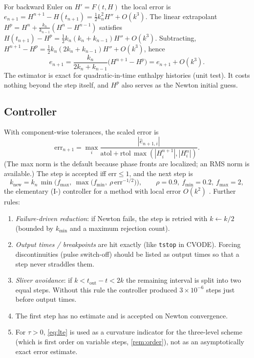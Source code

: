 \documentclass[11pt]{article}
\numberwithin{equation}{section}
\theoremstyle{remark}
\begin{document}
For backward Euler on $H'=F(t,H)$ the local error is
$e_{n+1}=H^{n+1}-H(t_{n+1})=\tfrac12k_n^2H''+O(k^3)$.  The linear extrapolant
$H^{p}=H^n+\frac{k_n}{k_{n-1}}(H^n-H^{n-1})$ satisfies
$H(t_{n+1})-H^{p}=\frac12k_n(k_n+k_{n-1})H''+O(k^3)$.  Subtracting,
$H^{n+1}-H^{p}=\frac12k_n(2k_n+k_{n-1})H''+O(k^3)$, hence
\begin{equation}
  \widehat e_{n+1} = \frac{k_n}{2k_n+k_{n-1}}\big(H^{n+1}-H^{p}\big)
  = e_{n+1}+O(k^3).
  \label{eq:lte}
\end{equation}
The estimator is exact for quadratic-in-time enthalpy histories (unit test).  It
costs nothing beyond the step itself, and $H^p$ also serves as the Newton
initial guess.

\subsection{Controller}

With component-wise tolerances, the scaled error is
\begin{equation}
  \mathrm{err}_{n+1} = \max_i
  \frac{|\widehat e_{n+1,i}|}{\mathrm{atol}+\mathrm{rtol}\,\max(|H_i^{n+1}|,|H_i^n|)} .
\end{equation}
(The max norm is the default because phase fronts are localized; an RMS norm
is available.)  The step is accepted iff $\mathrm{err}\le1$, and the next step is
\begin{equation}
  k_{\mathrm{new}} = k_n\,\min\!\Big(f_{\max},\ \max\big(f_{\min},\ \rho\,\mathrm{err}^{-1/2}\big)\Big),
  \qquad \rho=0.9,\ f_{\min}=0.2,\ f_{\max}=2,
\end{equation}
the elementary (I-) controller for a method with local error $O(k^2)$
\cite{hairer1993,soderlind2002}.  Further rules:
\begin{enumerate}[leftmargin=*]
\item \emph{Failure-driven reduction}: if Newton fails, the step is retried
  with $k\leftarrow k/2$ (bounded by $k_{\min}$ and a maximum rejection count).
\item \emph{Output times / breakpoints} are hit exactly (like
  \texttt{tstop} in CVODE).  Forcing discontinuities (pulse switch-off) should
  be listed as output times so that a step never straddles them.
\item \emph{Sliver avoidance}: if $k<t_{\mathrm{out}}-t<2k$ the remaining
  interval is split into two equal steps.  Without this rule the controller
  produced $3\times10^{-6}$ steps just before output times.
\item The first step has no estimate and is accepted on Newton convergence.
\item For $\tau>0$, \eqref{eq:lte} is used as a curvature indicator for the
  three-level scheme (which is first order on variable steps,
  \cref{rem:order}), not as an asymptotically exact error estimate.
\end{enumerate}
\end{document}
